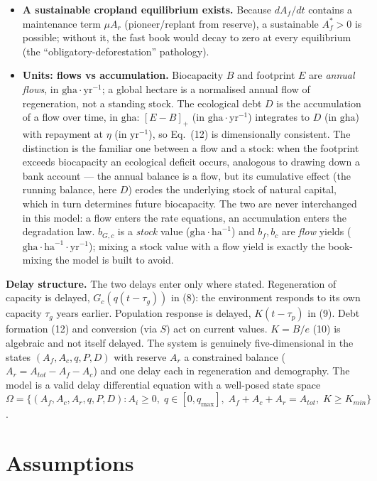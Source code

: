 \documentclass[11pt]{article}
\begin{document}
\begin{itemize}
\item \textbf{A sustainable cropland equilibrium exists.} Because $dA_f/dt$ contains a maintenance term $\mu A_r$ (pioneer/replant from reserve), a sustainable $A_f^*>0$ is possible; without it, the fast book would decay to zero at every equilibrium (the ``obligatory-deforestation'' pathology).
\item \textbf{Units: flows vs accumulation.} Biocapacity $B$ and footprint $E$ are \emph{annual flows}, in $\text{gha}\cdot\text{yr}^{-1}$; a global hectare is a normalised annual flow of regeneration, not a standing stock. The ecological debt $D$ is the accumulation of a flow over time, in $\text{gha}$: $[E-B]_+$ (in $\text{gha}\cdot\text{yr}^{-1}$) integrates to $D$ (in $\text{gha}$) with repayment at $\eta$ (in $\text{yr}^{-1}$), so Eq.~(12) is dimensionally consistent. The distinction is the familiar one between a flow and a stock: when the footprint exceeds biocapacity an ecological deficit occurs, analogous to drawing down a bank account --- the annual balance is a flow, but its cumulative effect (the running balance, here $D$) erodes the underlying stock of natural capital, which in turn determines future biocapacity. The two are never interchanged in this model: a flow enters the rate equations, an accumulation enters the degradation law. $b_{G,c}$ is a \emph{stock} value ($\text{gha}\cdot\text{ha}^{-1}$) and $b_f,b_c$ are \emph{flow} yields ($\text{gha}\cdot\text{ha}^{-1}\cdot\text{yr}^{-1}$); mixing a stock value with a flow yield is exactly the book-mixing the model is built to avoid.
\end{itemize}

\textbf{Delay structure.} The two delays enter only where stated. Regeneration of capacity is delayed, $G_c(q(t-\tau_g))$ in (8): the environment responds to its own capacity $\tau_g$ years earlier. Population response is delayed, $K(t-\tau_p)$ in (9). Debt formation (12) and conversion (via $S$) act on current values. $K=B/e$ (10) is algebraic and not itself delayed. The system is genuinely five-dimensional in the states $(A_f,A_c,q,P,D)$ with reserve $A_r$ a constrained balance ($A_r=A_{tot}-A_f-A_c$) and one delay each in regeneration and demography. The model is a valid delay differential equation with a well-posed state space $\Omega=\{(A_f,A_c,A_r,q,P,D):A_i\ge0,\;q\in[0,q_{\max}],\;A_f+A_c+A_r=A_{tot},\;K\ge K_{min}\}$.

\section{Assumptions}
\end{document}
